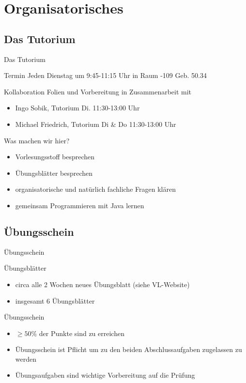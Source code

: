 \documentclass[18pt]{beamer}
\begin{document}
\section{Organisatorisches}
\subsection{Das Tutorium}
\begin{frame}{Das Tutorium}
\begin{block}{Termin}
	Jeden Dienstag um 9:45-11:15 Uhr in Raum -109 Geb. 50.34
\end{block}
\begin{block}{Kollaboration}
	Folien und Vorbereitung in Zusammenarbeit mit
	\begin{itemize}
		\item Ingo Sobik, Tutorium Di. 11:30-13:00 Uhr
		\item Michael Friedrich, Tutorium Di \& Do 11:30-13:00 Uhr
	\end{itemize}
\end{block}
\begin{block}{Was machen wir hier?}
	\begin{itemize}
		\item Vorlesungsstoff besprechen
		\item Übungsblätter besprechen
		\item organisatorische und natürlich fachliche Fragen klären
		\item gemeinsam Programmieren mit Java lernen
	\end{itemize}
\end{block}
\end{frame}

\subsection{Übungsschein}
\begin{frame}{Übungsschein}
	\begin{block}{Übungsblätter}
		\begin{itemize}
			\item circa alle 2 Wochen neues Übungsblatt (siehe VL-Website)
			\item insgesamt 6 Übungsblätter
		\end{itemize}
	\end{block}
	\pause
	\begin{block}{Übungsschein}
		\begin{itemize}
			\item $\geq 50\%$ der Punkte sind zu erreichen
			\item Übungsschein ist Pflicht um zu den beiden Abschlussaufgaben zugelassen zu werden
			\item Übungsaufgaben sind wichtige Vorbereitung auf die Prüfung
		\end{itemize}
	\end{block}
\end{frame}
\end{document}
